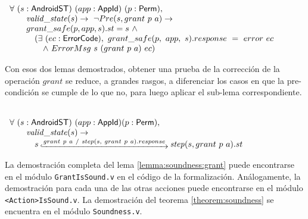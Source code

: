 \begin{lemma}
    \mbox{} \\
    $ \begin{array}[t]{l}
            \forall\ (s:\AndroidState)\ (app:\AppId)\ (p:\Perm),                                           \\
            \quad \quad \ap{valid\_state}{s} \rightarrow\ \neg Pre(s, grant\ p\ a) \rightarrow             \\
            \quad \quad grant\_safe(p, app, s).st = s\ \land                                               \\
            \quad \quad \quad (\exists\ (ec: \ErrorCode),\ grant\_safe(p,\ app,\ s).response\ =\ error\ ec \\
            \quad \quad \quad \quad \land\ ErrorMsg\ s\ (grant\ p\ a)\ ec)                                 \\
        \end{array} $
\end{lemma}

Con esos dos lemas demostrados, obtener una prueba de la corrección de la operación $grant$ se
reduce, a grandes rasgos, a diferenciar los casos en que la pre-condición se cumple de lo que no,
para luego aplicar el sub-lema correspondiente.

\begin{theorem}
     \label{lemma:soundness:grant}
    \mbox{} \\
    $ \begin{array}[t]{l}
            \forall\ (s:\AndroidState)\ (app:\AppId) (p:\Perm),                                                    \\
            \quad \quad \ap{valid\_state}{s} \rightarrow\                                                          \\
            \quad \quad \quad s\step{grant\ p\ a\ /\ step(s,\ grant\ p\ a).response} \bap{step}{s}{grant\ p\ a}.st \\
        \end{array} $
\end{theorem}

La demostración completa del lema \ref{lemma:soundness:grant} puede encontrarse en el módulo
\texttt{GrantIsSound.v} en el código de la formalización\cite{github-code}. Análogamente, la
demostración para cada una de las otras acciones puede encontrarse en el módulo
\texttt{<Action>IsSound.v}. La demostración del teorema \ref{theorem:soundness} se encuentra en el
módulo \texttt{Soundness.v}.

